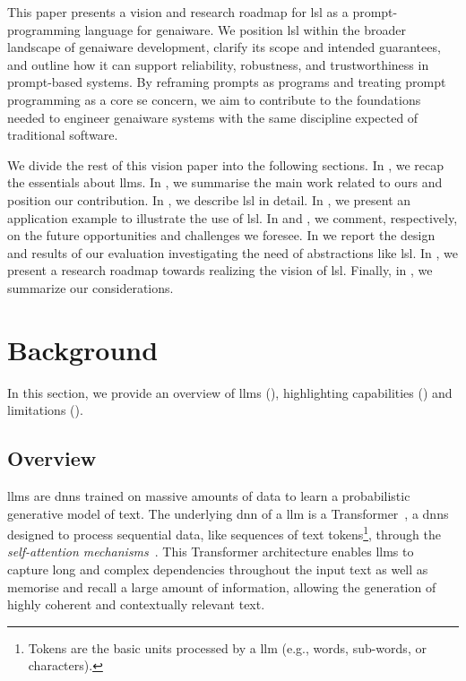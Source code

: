 \documentclass[manuscript,screen]{acmart}
\begin{document}
This paper presents a vision and research roadmap for \ac{lsl} as a prompt-programming language for \ac{genai}ware.
We position \ac{lsl} within the broader landscape of \ac{genai}ware development, clarify its scope and intended guarantees, and outline how it can support reliability, robustness, and trustworthiness in prompt-based systems.
By reframing prompts as programs and treating prompt programming as a core \ac{se} concern, we aim to contribute to the foundations needed to engineer \ac{genai}ware systems with the same discipline expected of traditional software.

We divide the rest of this vision paper into the following sections.
In , we recap the essentials about \acp{llm}.
In , we summarise the main work related to ours and position our contribution.
In , we describe \ac{lsl} in detail.
In , we present an application example to illustrate the use of \ac{lsl}.
In  and , we comment, respectively, on the future opportunities and challenges we foresee.
In  we report the design and results of our evaluation investigating the need of abstractions like \ac{lsl}.
In , we present a research roadmap towards realizing the vision of \ac{lsl}.
Finally, in , we summarize our considerations.

\section{Background}
\label{sec:background}

In this section, we provide an overview of \acp{llm} (), highlighting capabilities () and limitations ().

\subsection{Overview}
\label{sec:overview}



\acp{llm} are \acp{dnn} trained on massive amounts of data to learn a probabilistic generative model of text.
The underlying \ac{dnn} of a \ac{llm} is a Transformer~\cite{DBLP:conf/nips/VaswaniSPUJGKP17}, a \acp{dnn} designed to process sequential data, like sequences of text tokens\footnote{Tokens are the basic units processed by a \ac{llm} (e.g., words, sub-words, or characters).}, through the \emph{self-attention mechanisms}~\cite{DBLP:conf/nips/VaswaniSPUJGKP17}.
This Transformer architecture enables \acp{llm} to capture long and complex dependencies throughout the input text as well as memorise and recall a large amount of information, allowing the generation of highly coherent and contextually relevant text.
\end{document}
